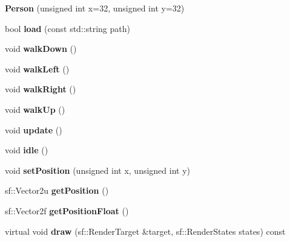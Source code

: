 \begin{DoxyCompactItemize}
\item 
\hypertarget{class_person_af9ab4a1858abbdab15789ecd7477e632}{{\bfseries Person} (unsigned int x=32, unsigned int y=32)}\label{class_person_af9ab4a1858abbdab15789ecd7477e632}

\item 
\hypertarget{class_person_a73d6e8605765366ca5418ec016631b13}{bool {\bfseries load} (const std\-::string path)}\label{class_person_a73d6e8605765366ca5418ec016631b13}

\item 
\hypertarget{class_person_ad84acc99859d273598a0ea4d015e273b}{void {\bfseries walk\-Down} ()}\label{class_person_ad84acc99859d273598a0ea4d015e273b}

\item 
\hypertarget{class_person_a9b2a96e9e6e852e491052355a72d5f11}{void {\bfseries walk\-Left} ()}\label{class_person_a9b2a96e9e6e852e491052355a72d5f11}

\item 
\hypertarget{class_person_a245fe777db6ab5608fb094fe8949bcb0}{void {\bfseries walk\-Right} ()}\label{class_person_a245fe777db6ab5608fb094fe8949bcb0}

\item 
\hypertarget{class_person_a85bc97062d5788982c80c3440e94f6e6}{void {\bfseries walk\-Up} ()}\label{class_person_a85bc97062d5788982c80c3440e94f6e6}

\item 
\hypertarget{class_person_ab895684028fe0d6a7bc23aec98ef8b0c}{void {\bfseries update} ()}\label{class_person_ab895684028fe0d6a7bc23aec98ef8b0c}

\item 
\hypertarget{class_person_a5ae9c72f29ec8028883834d23e77fd72}{void {\bfseries idle} ()}\label{class_person_a5ae9c72f29ec8028883834d23e77fd72}

\item 
\hypertarget{class_person_ada5c141dc555a1674a5669bc6277bd25}{void {\bfseries set\-Position} (unsigned int x, unsigned int y)}\label{class_person_ada5c141dc555a1674a5669bc6277bd25}

\item 
\hypertarget{class_person_a1033dc482040fb14df5052e845a6644d}{sf\-::\-Vector2u {\bfseries get\-Position} ()}\label{class_person_a1033dc482040fb14df5052e845a6644d}

\item 
\hypertarget{class_person_a4f500098aba679bacb9c2409ca5afdb2}{sf\-::\-Vector2f {\bfseries get\-Position\-Float} ()}\label{class_person_a4f500098aba679bacb9c2409ca5afdb2}

\item 
\hypertarget{class_person_ada1a779ea144c52b8e1738cb4199da21}{virtual void {\bfseries draw} (sf\-::\-Render\-Target \&target, sf\-::\-Render\-States states) const }\label{class_person_ada1a779ea144c52b8e1738cb4199da21}

\end{DoxyCompactItemize}
